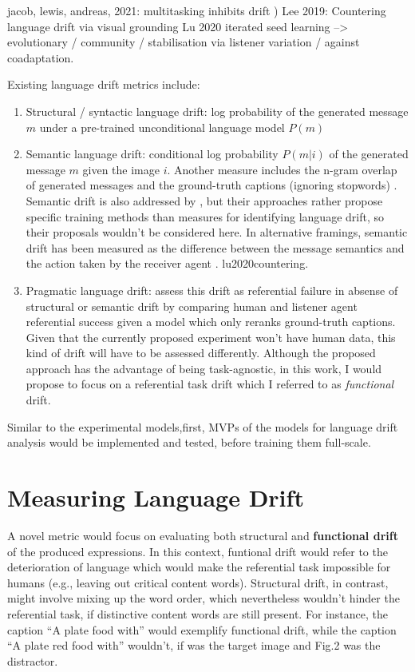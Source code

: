 jacob, lewis, andreas, 2021: multitasking inhibits drift )
Lee 2019: Countering language drift via visual grounding
Lu 2020 iterated seed learning --> evolutionary / community / stabilisation via listener variation / against coadaptation.


Existing language drift metrics include:
\begin{enumerate}
	\item Structural / syntactic language drift: log probability of the generated message $m$ under a pre-trained unconditional language model $P(m)$ \cite{lazaridou2020multi}
	\item Semantic language drift: conditional log probability $P(m|i)$ of the generated message $m$ given the image $i$. Another measure includes the n-gram overlap of generated messages and the ground-truth captions (ignoring stopwords) \cite{lazaridou2020multi}. Semantic drift is also addressed by \cite{lee2019countering}, \parencite{} but their approaches rather propose specific training methods than measures for identifying language drift, so their proposals wouldn't be considered here.
	In alternative framings, semantic drift has been measured as the difference between the message semantics and the action taken by the receiver agent \cite{}. lu2020countering.
	\item Pragmatic language drift: \cite{lazaridou2020multi} assess this drift as referential failure in absense of structural or semantic drift by comparing human and listener agent referential success given a model which only reranks ground-truth captions. Given that the currently proposed experiment won't have human data, this kind of drift will have to be assessed differently. Although the proposed approach has the advantage of being task-agnostic, in this work, I would propose to focus on a referential task drift which I referred to as \textit{functional} drift. 
\end{enumerate}
Similar to the experimental models,first, MVPs of the models for language drift analysis would be implemented and tested, before training them full-scale.



\section{Measuring Language Drift}

A novel metric would focus on evaluating both structural and \textbf{functional drift} of the produced expressions. In this context, funtional drift would refer to the deterioration of language which would make the referential task impossible for humans (e.g., leaving out critical content words). Structural drift, in contrast, might involve mixing up the word order, which nevertheless wouldn't hinder the referential task, if distinctive content words are still present. For instance, the caption ``A plate food with'' would exemplify functional drift, while the caption ``A plate red food with'' wouldn't, if was the target image and Fig.2 was the distractor. 


